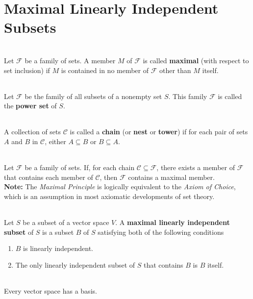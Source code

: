 \section{Maximal Linearly Independent Subsets}

\begin{definition}
	\hfill\\
	Let $\mathcal{F}$ be a family of sets. A member $M$ of $\mathcal{F}$ is called \textbf{maximal} (with respect to set inclusion) if $M$ is contained in no member of $\mathcal{F}$ other than $M$ itself.
\end{definition}

\begin{definition}
	\hfill\\
	Let $\mathcal{F}$ be the family of all subsets of a nonempty set $S$. This family $\mathcal{F}$ is called the \textbf{power set} of $S$. 
\end{definition}

\begin{definition}
	\hfill\\
	A collection of sets $\mathcal{C}$ is called a \textbf{chain} (or \textbf{nest} or \textbf{tower}) if for each pair of sets $A$ and $B$ in $\mathcal{C}$, either $A \subseteq B$ or $B \subseteq A$.
\end{definition}

\begin{definition}
	\hfill\\
	Let $\mathcal{F}$ be a family of sets. If, for each chain $\mathcal{C} \subseteq \mathcal{F}$, there exists a member of $\mathcal{F}$ that contains each member of $\mathcal{C}$, then $\mathcal{F}$ contains a maximal member.\\
	
	\textbf{Note:} The \textit{Maximal Principle} is logically equivalent to the \textit{Axiom of Choice}, which is an assumption in most axiomatic developments of set theory.
\end{definition}

\begin{definition}
	\hfill\\
	Let $S$ be a subset of a vector space $V$. A \textbf{maximal linearly independent subset} of $S$ is a subset $B$ of $S$ satisfying both of the following conditions
	
	\begin{enumerate}
		\item $B$ is linearly independent.
		\item The only linearly independent subset of $S$ that contains $B$ is $B$ itself.
	\end{enumerate}
\end{definition}

\begin{corollary}
	\hfill\\
	Every vector space has a basis.
\end{corollary}